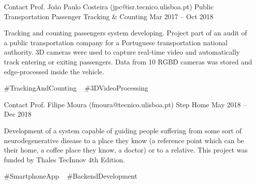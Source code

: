 \begin{cventries}
\cventry
	{Contact Prof. João Paulo Costeira (jpc@isr.tecnico.ulisboa.pt)} %
	{Public Transportation Passenger Tracking \& Counting} %
	{Mar 2017 – Oct 2018} %
	{} %
	{
		\begin{cvitems} %
			Tracking and counting passengers system developing. Project part of an audit of a public transportation company for a Portuguese transportation national authority.
			3D cameras were used to capture real-time video and automatically track entering or exiting passengers.
			Data from 10 RGBD cameras was stored and edge-processed inside the vehicle.
		\end{cvitems}
	}
	{
		\#TrackingAndCounting ~
		\#3DVideoProcessing ~
	}

\cventry
{Contact Prof. Filipe Moura (fmoura@tecnico.ulisboa.pt)} %
{Step Home} %
{May 2018 – Dec 2018} %
{} %
{
	\begin{cvitems} %
		Development of a system capable of guiding people suffering from some sort of neurodegenerative disease to a place they know (a reference point which can be their home, a coffee place they know, a doctor) or to a relative. This project was funded by Thales TecInnov 4th Edition.
	\end{cvitems}
}
{
	\#SmartphoneApp ~
	\#BackendDevelopment ~
}



\end{cventries}